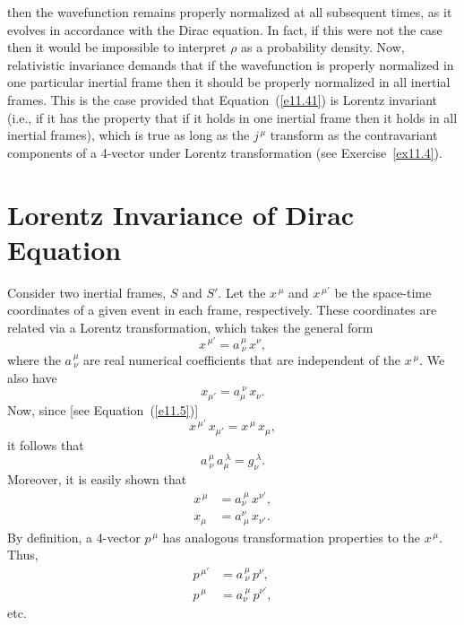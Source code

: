 then the wavefunction remains properly normalized at all subsequent times, as it evolves in accordance with the Dirac equation. 
In fact, if this were not the case then it would be impossible to interpret $\rho$ as a probability density. Now, relativistic
invariance demands that if the wavefunction is properly normalized in one particular inertial frame then it should
be properly normalized in all inertial frames. This is the case provided that Equation~(\ref{e11.41}) is Lorentz invariant (i.e., if it has the property
that if it holds
in one inertial frame then it holds in all inertial frames), 
which is true as long as the $j^{\,\mu}$ transform as the contravariant components of a  4-vector under  Lorentz transformation (see Exercise~\ref{ex11.4}). 

\section{Lorentz Invariance of Dirac Equation}
Consider two inertial frames, $S$ and $S'$. Let the $x^{\,\mu}$ and $x^{\,\mu'}$ be the space-time coordinates of a given event in each frame, respectively. 
These coordinates are  related via a Lorentz transformation, which takes the general form
\begin{equation}
x^{\,\mu'} = a^{\,\mu}_{~\nu}\,x^\nu,
\end{equation}
where the $a^{\,\mu}_{~\nu}$ are real numerical coefficients that are independent of the $x^{\,\mu}$. 
We also have
\begin{equation}
x_{\mu'} = a_{\mu}^{~\nu}\,x_\nu.
\end{equation}
Now, since [see Equation~(\ref{e11.5})]
\begin{equation}
x^{\,\mu'}\,x_{\mu'} = x^{\,\mu}\,x_\mu,
\end{equation}
it follows that
\begin{equation}\label{e11.51}
a^{\,\mu}_{~\nu}\,a_\mu^{~\lambda} = g_\nu^{~\lambda}.
\end{equation}
Moreover, it is easily shown that
\begin{align}
x^{\,\mu} &= a_\nu^{~\mu}\,x^{\nu'},\\[0.5ex]
x_\mu &= a^\nu_{~\mu}\,x_{\nu'}.
\end{align}
By definition,  a 4-vector $p^{\,\mu}$ has analogous transformation properties to the $x^{\,\mu}$. Thus,
\begin{align}
p^{\,\mu'} &= a^{\,\mu}_{~\nu}\,p^\nu,\\[0.5ex]
p^{\,\mu} &= a_\nu^{~\mu}\,p^{\nu'},
\end{align}
etc.

